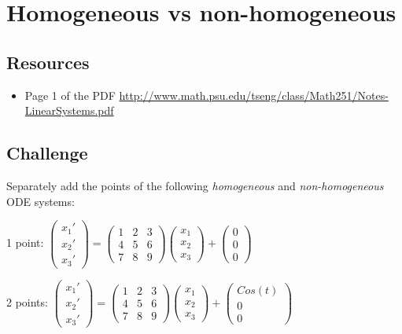\section{Homogeneous vs non-homogeneous}

\subsection*{Resources}
\begin{itemize}
    \item Page 1 of the PDF \url{http://www.math.psu.edu/tseng/class/Math251/Notes-LinearSystems.pdf}
\end{itemize}

\subsection*{Challenge}
Separately add the points of the following \emph{homogeneous} and \emph{non-homogeneous} ODE systems:

1 point:
$\displaystyle
\left(
    \begin{array}{c}
        x_1' \\
        x_2' \\
        x_3'
    \end{array}
\right)
=
\left(
    \begin{array}{ccc}
        1 & 2 & 3 \\
        4 & 5 & 6 \\
        7 & 8 & 9
    \end{array}
\right)
\left(
    \begin{array}{c}
        x_1 \\
        x_2 \\
        x_3
    \end{array}
\right)
+
\left(
    \begin{array}{c}
        0 \\
        0 \\
        0
    \end{array}
\right)
$

2 points:
$\displaystyle
\left(
    \begin{array}{c}
        x_1' \\
        x_2' \\
        x_3'
    \end{array}
\right)
=
\left(
    \begin{array}{ccc}
        1 & 2 & 3 \\
        4 & 5 & 6 \\
        7 & 8 & 9
    \end{array}
\right)
\left(
    \begin{array}{c}
        x_1 \\
        x_2 \\
        x_3
    \end{array}
\right)
+
\left(
    \begin{array}{c}
        Cos(t) \\
        0 \\
        0
    \end{array}
\right)$

